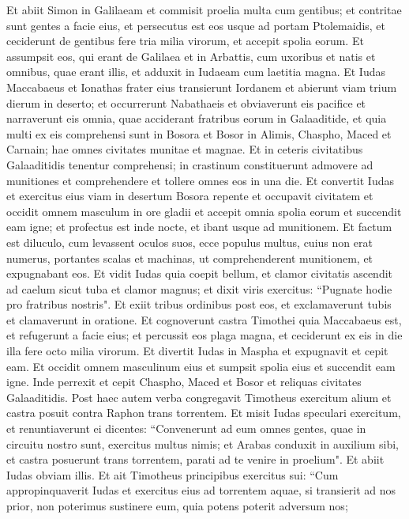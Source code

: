 \begin{biblechapter}
\verse Et abiit Simon in Galilaeam et commisit proelia multa cum gentibus; et contritae sunt gentes a facie eius, 
\verse et persecutus est eos usque ad portam Ptolemaidis, et ceciderunt de gentibus fere tria milia virorum, et accepit spolia eorum. 
\verse Et assumpsit eos, qui erant de Galilaea et in Arbattis, cum uxoribus et natis et omnibus, quae erant illis, et adduxit in Iudaeam cum laetitia magna. 
\verse Et Iudas Maccabaeus et Ionathas frater eius transierunt Iordanem et abierunt viam trium dierum in deserto; 
\verse et occurrerunt Nabathaeis et obviaverunt eis pacifice et narraverunt eis omnia, quae acciderant fratribus eorum in Galaaditide, 
\verse et quia multi ex eis comprehensi sunt in Bosora et Bosor in Alimis, Chaspho, Maced et Carnain; hae omnes civitates munitae et magnae. 
\verse Et in ceteris civitatibus Galaaditidis tenentur comprehensi; in crastinum constituerunt admovere ad munitiones et comprehendere et tollere omnes eos in una die. 
\verse Et convertit Iudas et exercitus eius viam in desertum Bosora repente et occupavit civitatem et occidit omnem masculum in ore gladii et accepit omnia spolia eorum et succendit eam igne; 
\verse et profectus est inde nocte, et ibant usque ad munitionem. 
\verse Et factum est diluculo, cum levassent oculos suos, ecce populus multus, cuius non erat numerus, portantes scalas et machinas, ut comprehenderent munitionem, et expugnabant eos. 
\verse Et vidit Iudas quia coepit bellum, et clamor civitatis ascendit ad caelum sicut tuba et clamor magnus; 
\verse et dixit viris exercitus: “Pugnate hodie pro fratribus nostris". 
\verse Et exiit tribus ordinibus post eos, et exclamaverunt tubis et clamaverunt in oratione. 
\verse Et cognoverunt castra Timothei quia Maccabaeus est, et refugerunt a facie eius; et percussit eos plaga magna, et ceciderunt ex eis in die illa fere octo milia virorum. 
\verse Et divertit Iudas in Maspha et expugnavit et cepit eam. Et occidit omnem masculinum eius et sumpsit spolia eius et succendit eam igne. 
\verse Inde perrexit et cepit Chaspho, Maced et Bosor et reliquas civitates Galaaditidis. 
\verse Post haec autem verba congregavit Timotheus exercitum alium et castra posuit contra Raphon trans torrentem. 
\verse Et misit Iudas speculari exercitum, et renuntiaverunt ei dicentes: “Convenerunt ad eum omnes gentes, quae in circuitu nostro sunt, exercitus multus nimis; 
\verse et Arabas conduxit in auxilium sibi, et castra posuerunt trans torrentem, parati ad te venire in proelium". Et abiit Iudas obviam illis. 
\verse Et ait Timotheus principibus exercitus sui: “Cum appropinquaverit Iudas et exercitus eius ad torrentem aquae, si transierit ad nos prior, non poterimus sustinere eum, quia potens poterit adversum nos; 

\end{biblechapter}
